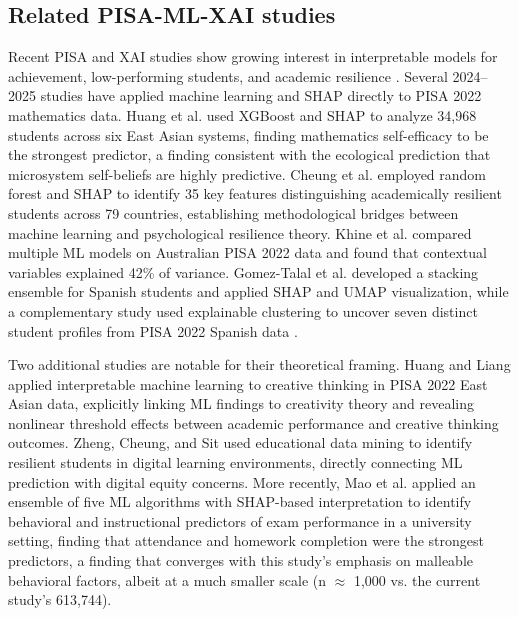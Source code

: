 \documentclass[pdflatex,sn-mathphys-ay]{sn-jnl}
\begin{document}
\FloatBarrier
\subsection{Related PISA-ML-XAI studies}

Recent PISA and XAI studies show growing interest in interpretable models for achievement, low-performing students, and academic resilience \citep{PISA_2018_XAI_math,PISA_2022_XAI_low_performers,PISA_2022_XAI_resilience}. Several 2024--2025 studies have applied machine learning and SHAP directly to PISA 2022 mathematics data. Huang et al. \citep{Huang_2024} used XGBoost and SHAP to analyze 34,968 students across six East Asian systems, finding mathematics self-efficacy to be the strongest predictor, a finding consistent with the ecological prediction that microsystem self-beliefs are highly predictive. Cheung et al. \citep{Cheung_2024_resilience} employed random forest and SHAP to identify 35 key features distinguishing academically resilient students across 79 countries, establishing methodological bridges between machine learning and psychological resilience theory. Khine et al. \citep{Khine_2024} compared multiple ML models on Australian PISA 2022 data and found that contextual variables explained 42\% of variance. Gomez-Talal et al. \citep{Gomez_Talal_2025} developed a stacking ensemble for Spanish students and applied SHAP and UMAP visualization, while a complementary study used explainable clustering to uncover seven distinct student profiles from PISA 2022 Spanish data \citep{Gomez_Talal_2024_clusters}.

Two additional studies are notable for their theoretical framing. Huang and Liang \citep{Huang_Liang_2025} applied interpretable machine learning to creative thinking in PISA 2022 East Asian data, explicitly linking ML findings to creativity theory and revealing nonlinear threshold effects between academic performance and creative thinking outcomes. Zheng, Cheung, and Sit \citep{Cheung_2024_digital} used educational data mining to identify resilient students in digital learning environments, directly connecting ML prediction with digital equity concerns. More recently, Mao et al. \citep{Mao_2025} applied an ensemble of five ML algorithms with SHAP-based interpretation to identify behavioral and instructional predictors of exam performance in a university setting, finding that attendance and homework completion were the strongest predictors, a finding that converges with this study's emphasis on malleable behavioral factors, albeit at a much smaller scale (n $\approx$ 1,000 vs. the current study's 613,744).
\end{document}
